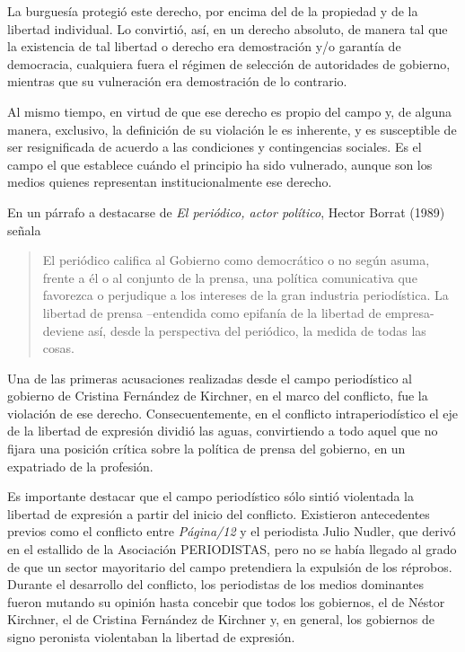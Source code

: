 La burguesía protegió este derecho, por encima del de la propiedad y de la libertad individual. Lo convirtió, así, en un derecho absoluto, de manera tal que la existencia de tal libertad o derecho era demostración y/o garantía de democracia, cualquiera fuera el régimen de selección de autoridades de gobierno, mientras que su vulneración era demostración de lo contrario.

Al mismo tiempo, en virtud de que ese derecho es propio del campo y, de alguna manera, exclusivo, la definición de su violación le es inherente, y es susceptible de ser resignificada de acuerdo a las condiciones y contingencias sociales. Es el campo el que establece cuándo el principio ha sido vulnerado, aunque son los medios quienes representan institucionalmente ese derecho.

En un párrafo a destacarse de \emph{El periódico, actor político}, Hector Borrat (1989) señala

\begin{quote}
El periódico califica al Gobierno como democrático o no según asuma, frente a él o al conjunto de la prensa, una política comunicativa que favorezca o perjudique a los intereses de la gran industria periodística. La libertad de prensa --entendida como epifanía de la libertad de empresa- deviene así, desde la perspectiva del periódico, la medida de todas las cosas.
\end{quote}

Una de las primeras acusaciones realizadas desde el campo periodístico al gobierno de Cristina Fernández de Kirchner, en el marco del conflicto, fue la violación de ese derecho. Consecuentemente, en el conflicto intraperiodístico el eje de la libertad de expresión dividió las aguas, convirtiendo a todo aquel que no fijara una posición crítica sobre la política de prensa del gobierno, en un expatriado de la profesión.

Es importante destacar que el campo periodístico sólo sintió violentada la libertad de expresión a partir del inicio del conflicto. Existieron antecedentes previos como el conflicto entre \emph{Página/12} y el periodista Julio Nudler, que derivó en el estallido de la Asociación PERIODISTAS, pero no se había llegado al grado de que un sector mayoritario del campo pretendiera la expulsión de los réprobos. Durante el desarrollo del conflicto, los periodistas de los medios dominantes fueron mutando su opinión hasta concebir que todos los gobiernos, el de Néstor Kirchner, el de Cristina Fernández de Kirchner y, en general, los gobiernos de signo peronista violentaban la libertad de expresión.

